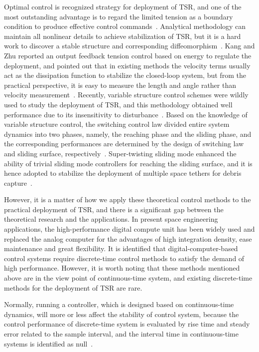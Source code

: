 \documentclass[10pt,onecolumn,draftcls]{IEEEtran}
\begin{document}
Optimal control  is recognized strategy for deployment of TSR, and one of the most outstanding advantage is to regard the limited tension as a boundary condition to produce effective control commands~\cite{williams2008deployment,wen2008optimal}. 
Analytical methodology can maintain all nonlinear details to achieve stabilization of TSR, but it is a hard work to discover a stable structure and corresponding diffeomorphism~\cite{yu2017analytical}. 
Kang and Zhu reported an output feedback tension control based on energy to regulate the deployment, and pointed out that in existing methods the velocity terms usually act as the dissipation function to stabilize the closed-loop system, but from the practical perspective, it is easy to measure the length and angle rather than velocity measurement~\cite{Kang2018}.
Recently, variable structure control schemes were wildly used to study the deployment of TSR, and this methodology obtained well performance due to its insensitivity to disturbance~\cite{zhang2017adaptive}. Based on the knowledge of variable structure control, the switching control law divided entire system dynamics into two phases, namely, the reaching phase and the sliding phase, and the corresponding performances are determined by the design of switching law and sliding surface,  respectively~\cite{ma2017dynamic,ma2018pure}. Super-twisting sliding mode enhanced the ability of trivial sliding mode controllers for reaching the sliding surface, and it is hence adopted to stabilize the deployment of multiple space tethers for debris capture~\cite{Zhang2017JGCD}.

However, it is a matter of how we apply these theoretical control methods to the practical deployment of TSR, and there is a significant gap between the theoretical research and the applications. In present space engineering applications, the high-performance digital compute unit has been widely used and replaced the analog computer for the advantages of high integration density, ease maintenance and great flexibility. It is identified that digital-computer-based control systems require discrete-time control methods to satisfy the demand of high performance. However, it is worth noting that these methods mentioned above are in the view point of continuous-time system, and existing discrete-time methods for the deployment of TSR are rare. 

Normally, running a controller, which is designed based on continuous-time dynamics, will more or less affect the stability of control system, because the control performance of discrete-time system is evaluated by rise time and steady error related to the sample interval, and the interval time in continuous-time systems is identified as null~\cite{sun2018discrete}.  
\end{document}
